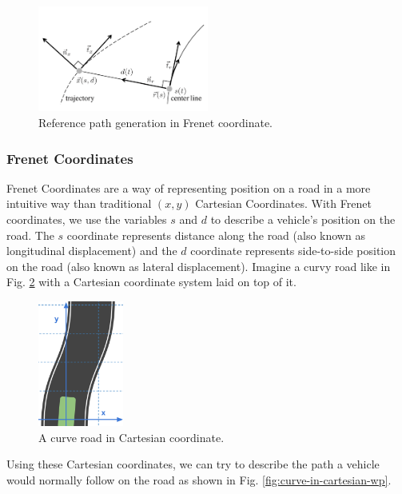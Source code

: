 \begin{figure}[h]
\centering
\includegraphics[width=0.5\textwidth]{figs/ch3/traj-generation}
\caption{Reference path generation in Frenet coordinate.}
\label{fig:traj-generation}
\end{figure}

\subsubsection{Frenet Coordinates}


Frenet Coordinates are a way of representing position on a road in a more intuitive way than traditional $(x,y)$ Cartesian Coordinates. With Frenet coordinates, we use the variables $s$ and $d$ to describe a vehicle's position on the road. The $s$ coordinate represents distance along the road (also known as longitudinal displacement) and the $d$ coordinate represents side-to-side position on the road (also known as lateral displacement). Imagine a curvy road like in Fig. \ref{fig:curve-in-cartesian} with a Cartesian coordinate system laid on top of it.

\begin{figure}[h]
\centering
\includegraphics[width=0.25\textwidth]{figs/ch3/curve-in-cartesian}
\caption{A curve road in Cartesian coordinate.}
\label{fig:curve-in-cartesian}
\end{figure}

Using these Cartesian coordinates, we can try to describe the path a vehicle would normally follow on the road as shown in Fig. \ref{fig:curve-in-cartesian-wp}.

